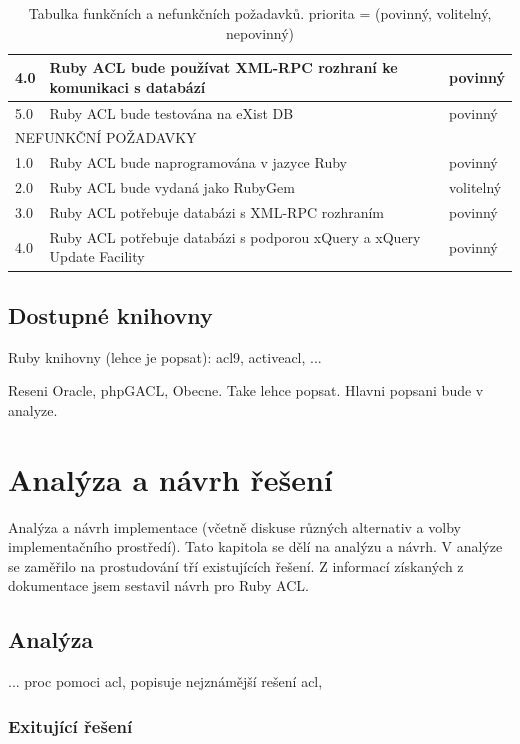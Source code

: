 \documentclass[11pt,twoside,a4paper]{book}
\begin{document}
\begin{table}
\begin{center}
\begin{tabular}{|l|p{9cm}|l|}
\hline
4.0 & Ruby ACL bude používat XML-RPC rozhraní ke komunikaci s databází & povinný\\
\hline
5.0 & Ruby ACL bude testována na eXist DB & povinný\\
\hline
\multicolumn{3}{|l|}{NEFUNKČNÍ POŽADAVKY} \\
\hline
1.0 & Ruby ACL bude naprogramována v jazyce Ruby & povinný \\
\hline
2.0 & Ruby ACL bude vydaná jako RubyGem & volitelný\\
\hline
3.0 & Ruby ACL potřebuje databázi s XML-RPC rozhraním & povinný\\
\hline
4.0 & Ruby ACL potřebuje databázi s podporou xQuery a xQuery Update Facility & povinný\\
\hline
\end{tabular}
\end{center}
\caption{Tabulka funkčních a nefunkčních požadavků. priorita = (povinný, volitelný, nepovinný)}
\label{tab:tab1}
\end{table}

\section{Dostupné knihovny}

Ruby knihovny (lehce je popsat): acl9, activeacl, ... 

Reseni Oracle, phpGACL, Obecne. Take lehce popsat. Hlavni popsani bude v analyze.



\chapter{Analýza a návrh řešení}
Analýza a návrh implementace (včetně diskuse různých alternativ a volby implementačního prostředí).
Tato kapitola se dělí na analýzu a návrh. V analýze se zaměřilo na prostudování tří existujících řešení. Z informací získaných z dokumentace jsem sestavil návrh pro Ruby ACL.

\section{Analýza}

... proc pomoci acl, popisuje nejznámější rešení acl, 



\subsection{Exitující řešení}
\end{document}
